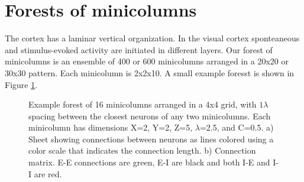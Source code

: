 \section{Forests of minicolumns}
The cortex has a laminar vertical organization.
In the visual cortex sponteaneous and stimulus-evoked activity are initiated in different layers\citep{Sakata2009}.
Our forest of minicolumns is an ensemble of 400 or 600 minicolumns arranged in a 20x20 or 30x30 pattern.
Each minicolumn is 2x2x10.
A small example foresst is shown in Figure \ref{fig:forest_structure}.
\begin{figure}[!htb]
 \caption{ Example forest of 16 minicolumns arranged in a 4x4 grid, with $1\lambda$ spacing between the closest neurons of any two minicolumns. 
              Each minicolumn has dimensions X=2, Y=2, Z=5, $\lambda$=2.5, and C=0.5. 
          a)  Sheet showing connections between neurons as lines colored using a color scale that indicates the connection length. 
          b)  Connection matrix. E-E connections are green, E-I are black and both I-E and I-I  are red. }
 \label{fig:forest_structure}
\end{figure}
\FloatBarrier

